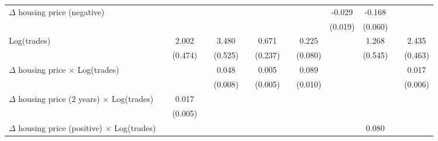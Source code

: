 \begin{sidewaystable}[htbp]
\begin{tabular}{l*{12}{c}}
$\Delta$ housing price (negative)&                    &                    &                    &                    &                    &                    &                    &                    &      -0.029        &      -0.168\sym{**}&                    &                    \\
                    &                    &                    &                    &                    &                    &                    &                    &                    &     (0.019)        &     (0.060)        &                    &                    \\
Log(trades)         &                    &       2.002\sym{**}&                    &       3.480\sym{**}&                    &       0.671\sym{**}&                    &       0.225\sym{**}&                    &       1.268\sym{*} &                    &       2.435\sym{**}\\
                    &                    &     (0.474)        &                    &     (0.525)        &                    &     (0.237)        &                    &     (0.080)        &                    &     (0.545)        &                    &     (0.463)        \\
$\Delta$ housing price $\times$ Log(trades)&                    &                    &                    &       0.048\sym{**}&                    &       0.005        &                    &       0.089\sym{**}&                    &                    &                    &       0.017\sym{**}\\
                    &                    &                    &                    &     (0.008)        &                    &     (0.005)        &                    &     (0.010)        &                    &                    &                    &     (0.006)        \\
$\Delta$ housing price (2 years) $\times$ Log(trades)&                    &       0.017\sym{**}&                    &                    &                    &                    &                    &                    &                    &                    &                    &                    \\
                    &                    &     (0.005)        &                    &                    &                    &                    &                    &                    &                    &                    &                    &                    \\
$\Delta$ housing price (positive) $\times$ Log(trades)&                    &                    &                    &                    &                    &                    &                    &                    &                    &       0.080\sym{**}&                    &                    \\

\end{tabular}
\end{sidewaystable}
